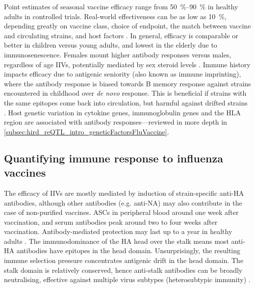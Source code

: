 Point estimates of seasonal vaccine efficacy range from \SIrange{50}{90}{\percent} in healthy adults in controlled trials.
Real-world effectiveness can be as low as \SI{10}{\percent}, depending greatly on vaccine class, choice of endpoint, the match between vaccine and circulating strains, and host factors
\autocite{dhakal2019HostFactorsImpact}.
In general, efficacy is comparable or better in children versus young adults, and lowest in the elderly due to immunosenescence.
Females mount higher antibody responses versus males, regardless of age \glspl{IIV}, potentially mediated by sex steroid levels \autocite{dhakal2019HostFactorsImpact}.
Immune history impacts efficacy due to antigenic seniority (also known as immune imprinting), where the antibody response is biased towards B memory response against strains encountered in childhood over \textit{de novo} response.
This is beneficial if strains with the same epitopes come back into circulation, but harmful against drifted strains \autocite{henry2018OriginalAntigenicSin,dhakal2019HostFactorsImpact}.
Host genetic variation in cytokine genes, immunoglobulin genes and the \gls{HLA} region are associated with antibody responses---reviewed in more depth in \cref{subsec:hird_reQTL_intro_geneticFactorsFluVaccine}.

\subsection{Quantifying immune response to influenza vaccines}

The efficacy of \glspl{IIV} are mostly mediated by induction of strain-specific anti-\gls{HA} antibodies,
although other antibodies (e.g. anti-\gls{NA}) may also contribute in the case of non-purified vaccines.
\Glspl{ASC} in peripheral blood around one week after vaccination, and serum antibodies peak around two to four weeks after vaccination.
Antibody-mediated protection may last up to a year in healthy adults \autocite{bresee2018InactivatedInfluenzaVaccines,davis2020InfluenzaVaccineInduced}.
The immunodominance of the \gls{HA} head over the stalk means most anti-\gls{HA} antibodies have epitopes in the head domain.
Unsurprisingly, the resulting immune selection pressure concentrates antigenic drift in the head domain.
The stalk domain is relatively conserved, hence anti-stalk antibodies can be broadly neutralising, effective against multiple virus subtypes (heterosubtypic immunity) \autocite{sano2017RoadMoreEffective}.

